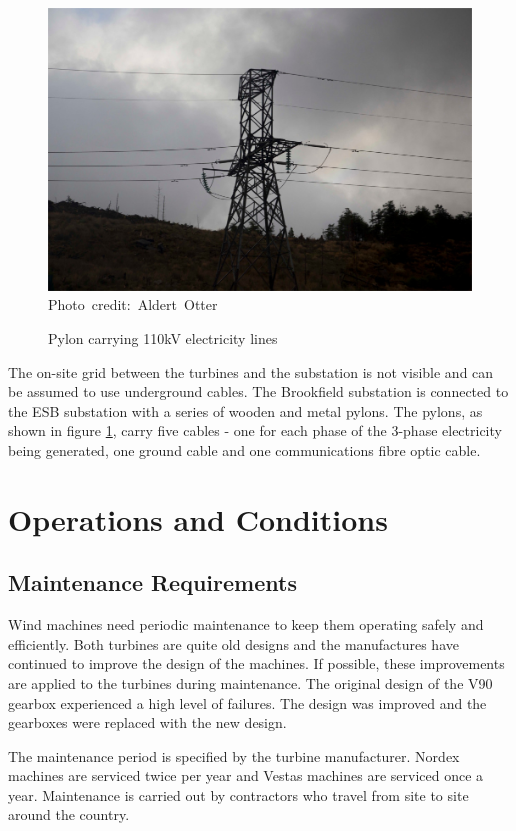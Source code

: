 \documentclass[12pt]{article} %
\begin{document}
\begin{figure}[H]
  \begin{center}
    \includegraphics[width=1\textwidth]{pylons}
  \hbox{\scriptsize Photo credit: Aldert Otter}
  \end{center}
  \caption{Pylon carrying 110kV electricity lines}
  \label{fig:pylons}
\end{figure}
The on-site grid between the turbines and the substation is not visible and can be assumed to use underground cables.
The Brookfield substation is connected to the ESB substation with a series of wooden and metal pylons. The pylons, as shown in figure \ref{fig:pylons}, carry five cables - one for each phase of the 3-phase electricity being generated, one ground cable and one communications fibre optic cable.


\section{Operations and Conditions}

\subsection{Maintenance Requirements}
Wind machines need periodic maintenance to keep them operating safely and efficiently. 
Both turbines are quite old designs and the manufactures have continued to improve the design of the machines. If possible, these improvements are applied to the turbines during maintenance.
The original design of the V90 gearbox experienced a high level of failures. The design was improved and the gearboxes were replaced with the new design.

The maintenance period is specified by the turbine manufacturer.
Nordex machines are serviced twice per year and Vestas machines are serviced once a year. 
Maintenance is carried out by contractors who travel from site to site around the country.
\end{document}
